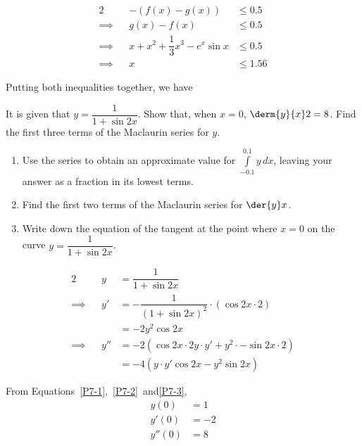 \documentclass{jhwhw}
\begin{document}
            \begin{alignat*}{2}
                &&-\left(f(x) - g(x)\right) &\leq 0.5\\
                \implies&&g(x) - f(x) &\leq 0.5\\
                \implies&&x + x^2 + \dfrac13 x^3 - e^x \sin x &\leq 0.5\\
                \implies&&x &\leq 1.56
            \end{alignat*}

            Putting both inequalities together, we have


    \problem{}
        It is given that $y = \dfrac1{1 + \sin 2x}$. Show that, when $x = 0$, $\derm{y}{x}2 = 8$. Find the first three terms of the Maclaurin series for $y$.

        \begin{enumerate}
            \item Use the series to obtain an approximate value for $\int\limits_{-0.1}^{0.1} y \, dx$, leaving your answer as a fraction in its lowest terms.
            \item Find the first two terms of the Maclaurin series for $\der{y}x$.
            \item Write down the equation of the tangent at the point where $x = 0$ on the curve $y = \dfrac1{1 + \sin 2x}$.
        \end{enumerate}

    \solution
        \begin{alignat}{2}
            && y &= \dfrac1{1 + \sin 2x} \label{P7-1} \\
            \implies&&y' &= -\dfrac1{(1+\sin 2x)^2} \cdot (\cos 2x \cdot 2)\nonumber\\
            && &= -2 y^2\cos 2x \label{P7-2}\\
            \implies&&y'' &= -2 \left(\cos 2x \cdot 2y\cdot y' + y^2 \cdot -\sin 2x \cdot 2\right)\nonumber\\
            && &= -4\left(y\cdot y' \cos 2x - y^2\sin 2x  \right)\label{P7-3}
        \end{alignat}
        
        From Equations~\ref{P7-1},~\ref{P7-2}~and\ref{P7-3},
        \begin{align*}
            y(0) &= 1\\
            y'(0) &= -2\\
            y''(0) &= 8
        \end{align*}
\end{document}
